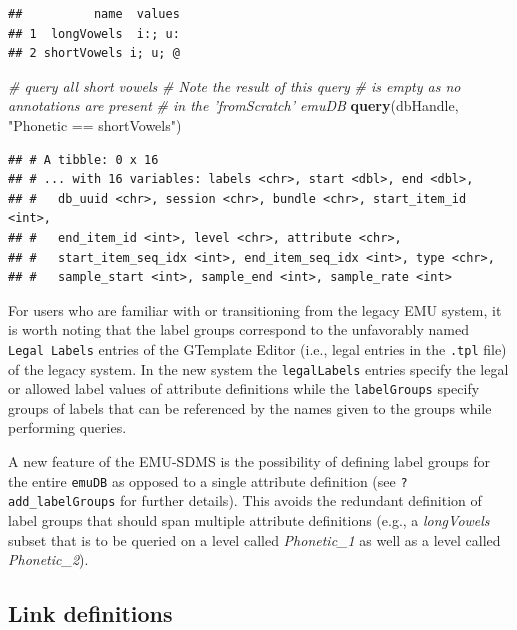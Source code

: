 \documentclass[]{book}
\newenvironment{Shaded}{\begin{snugshade}}{\end{snugshade}}
\newcommand{\CommentTok}[1]{\textcolor[rgb]{0.56,0.35,0.01}{\textit{#1}}}
\newcommand{\KeywordTok}[1]{\textcolor[rgb]{0.13,0.29,0.53}{\textbf{#1}}}
\newcommand{\NormalTok}[1]{#1}
\newcommand{\StringTok}[1]{\textcolor[rgb]{0.31,0.60,0.02}{#1}}
\begin{document}
\begin{verbatim}
##          name  values
## 1  longVowels  i:; u:
## 2 shortVowels i; u; @
\end{verbatim}

\begin{Shaded}
\begin{Highlighting}[]
\CommentTok{# query all short vowels}
\CommentTok{# Note the result of this query}
\CommentTok{# is empty as no annotations are present}
\CommentTok{# in the 'fromScratch' emuDB}
\KeywordTok{query}\NormalTok{(dbHandle, }\StringTok{"Phonetic == shortVowels"}\NormalTok{)}
\end{Highlighting}
\end{Shaded}

\begin{verbatim}
## # A tibble: 0 x 16
## # ... with 16 variables: labels <chr>, start <dbl>, end <dbl>,
## #   db_uuid <chr>, session <chr>, bundle <chr>, start_item_id <int>,
## #   end_item_id <int>, level <chr>, attribute <chr>,
## #   start_item_seq_idx <int>, end_item_seq_idx <int>, type <chr>,
## #   sample_start <int>, sample_end <int>, sample_rate <int>
\end{verbatim}

For users who are familiar with or transitioning from the legacy EMU system, it is worth noting that the label groups correspond to the unfavorably named \texttt{Legal\ Labels} entries of the GTemplate Editor (i.e., legal entries in the \texttt{.tpl} file) of the legacy system. In the new system the \texttt{legalLabels} entries specify the legal or allowed label values of attribute definitions while the \texttt{labelGroups} specify groups of labels that can be referenced by the names given to the groups while performing queries.

A new feature of the EMU-SDMS is the possibility of defining label groups for the entire \texttt{emuDB} as opposed to a single attribute definition (see \texttt{?add\_labelGroups} for further details). This avoids the redundant definition of label groups that should span multiple attribute definitions (e.g., a \emph{longVowels} subset that is to be queried on a level called \emph{Phonetic\_1} as well as a level called \emph{Phonetic\_2}).

\hypertarget{link-definitions}{%
\subsection{Link definitions}\label{link-definitions}}
\end{document}
